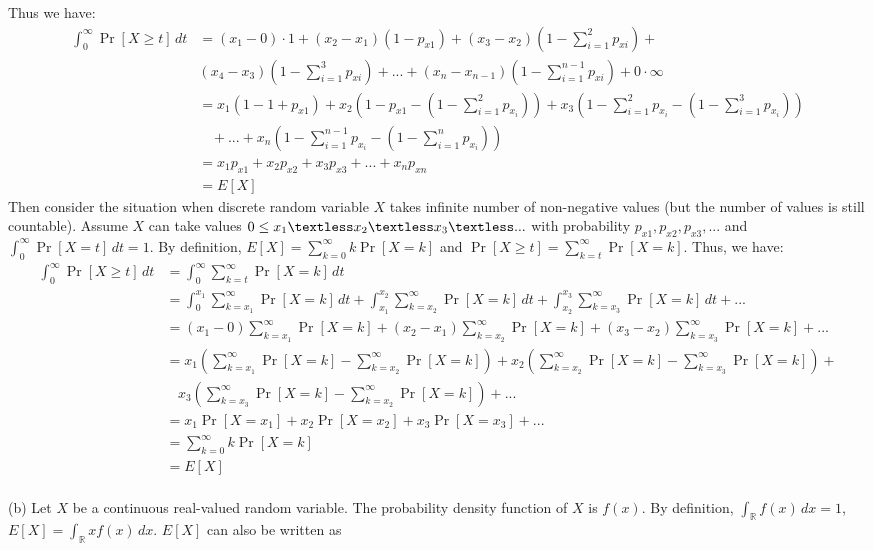 Thus we have:
\begin{align}
  \nonumber\int_{0}^{\infty}\Pr[X\ge t]\, dt &= (x_1-0)\cdot 1+(x_2-x_1) (1-p_{x1})+(x_3-x_2) (1-\sum_{i=1}^{2}p_{xi})+\\
  \nonumber&(x_4-x_3) (1-\sum_{i=1}^{3}p_{xi})+...+(x_n-x_{n-1})(1-\sum_{i=1}^{n-1}p_{xi})+0\cdot \infty\\
  \nonumber&=x_1(1-1+p_{x1})+x_2(1-p_{x1}-(1-\sum_{i=1}^2p_{x_i}))+x_3(1-\sum_{i=1}^2p_{x_i}-(1-\sum_{i=1}^3p_{x_i}))\\
  \nonumber&~~~~+...+x_n(1-\sum_{i=1}^{n-1}p_{x_i}-(1-\sum_{i=1}^np_{x_i}))\\
  \nonumber&=x_1p_{x1}+x_2p_{x2}+x_3p_{x3}+...+x_np_{xn}\\
  \nonumber&=E[X]
\end{align}
Then consider the situation when discrete random variable $X$ takes infinite number of non-negative values (but the number of values is still countable).
Assume $X$ can take values $0\le x_1\textless x_2 \textless x_3 \textless ...$ with probability $p_{x1},p_{x2},p_{x3},...$ and $\int_{0}^{\infty}\Pr[X=t]\, dt=1$. By definition, $E[X]=\sum_{k=0}^{\infty}k\Pr[X=k]$ and $\Pr[X\ge t]=\sum_{k=t}^{\infty}\Pr[X=k]$. Thus, we have:
\begin{align}
  \nonumber\int_{0}^{\infty}\Pr[X\ge t]\, dt &=\int_{0}^{\infty}\sum_{k=t}^{\infty}\Pr[X=k] \, dt\\
  \nonumber&=\int_{0}^{x_1}\sum_{k=x_1}^{\infty}\Pr[X=k] \, dt + \int_{x_1}^{x_2}\sum_{k=x_2}^{\infty}\Pr[X=k] \, dt + \int_{x_2}^{x_3}\sum_{k=x_3}^{\infty}\Pr[X=k] \, dt +...\\
  \nonumber&=(x_1-0)\sum_{k=x_1}^{\infty}\Pr[X=k]+(x_2-x_1)\sum_{k=x_2}^{\infty}\Pr[X=k]+(x_3-x_2)\sum_{k=x_3}^{\infty}\Pr[X=k]+...\\
  \nonumber&=x_1(\sum_{k=x_1}^{\infty}\Pr[X=k]-\sum_{k=x_2}^{\infty}\Pr[X=k])+x_2(\sum_{k=x_2}^{\infty}\Pr[X=k]-\sum_{k=x_3}^{\infty}\Pr[X=k])+\\
  \nonumber&~~~~ x_3(\sum_{k=x_3}^{\infty}\Pr[X=k]-\sum_{k=x_2}^{\infty}\Pr[X=k])+...\\
  \nonumber&=x_1\Pr[X=x_1]+x_2\Pr[X=x_2]+x_3\Pr[X=x_3]+...\\
  \nonumber &=\sum_{k=0}^{\infty}k\Pr[X=k]\\
  \nonumber &=E[X]
\end{align}
\\
(b)
Let $X$ be a continuous real-valued random variable. The probability density function of $X$ is $f(x)$. By definition, $\int_{\mathbb{R}}f(x)\, dx=1$, $E[X]=\int_{\mathbb{R}}xf(x)\, dx$. $E[X]$ can also be written as

